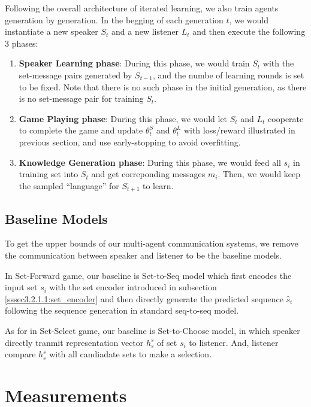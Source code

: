 Following the overall architecture of iterated learning, we also train agents generation by generation. In the begging of each generation $t$, we would instantiate a new speaker $S_t$ and a new listener $L_t$ and then execute the following 3 phases:

\begin{enumerate}
  \item \textbf{Speaker Learning phase}: During this phase, we would train $S_t$ with the set-message pairs generated by $S_{t-1}$, and the numbe of learning rounds is set to be fixed. Note that there is no such phase in the initial generation, as there is no set-message pair for training $S_t$.
  \item \textbf{Game Playing phase}: During this phase, we would let $S_t$ and $L_t$ cooperate to complete the game and update $\theta^S_t$ and $\theta^L_t$ with loss/reward illustrated in previous section, and use early-stopping to avoid overfitting.
  \item \textbf{Knowledge Generation phase}: During this phase, we would feed all $s_i$ in training set into $S_t$ and get correponding messages $m_i$. Then, we would keep the sampled ``language'' for $S_{t+1}$ to learn.
\end{enumerate}

\subsection{Baseline Models}
\label{ssec3.2.5:baselines}

To get the upper bounds of our multi-agent communication systems, we remove the communication between speaker and listener to be the baseline models.

In Set-Forward game, our baseline is Set-to-Seq model which first encodes the input set $s_i$ with the set encoder introduced in subsection \ref{sssec3.2.1.1:set_encoder} and then directly generate the predicted sequence $\hat{s}_i$ following the sequence generation in standard seq-to-seq model.

As for in Set-Select game, our baseline is Set-to-Choose model, in which speaker directly tranmit representation vector $h^s_s$ of set $s_i$ to listener. And, listener compare $h^s_s$ with all candiadate sets to make a selection.

\section{Measurements}
\label{sec3.3:measurements}

